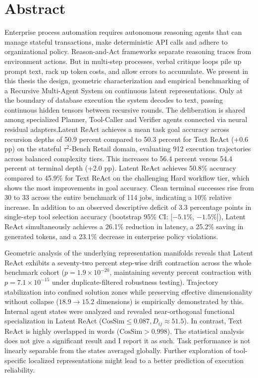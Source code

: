 \documentclass[a4paper, 12pt]{report}
\theoremstyle{definition}
\begin{document}
	\section*{{\huge Abstract}\hfill}
	\vspace{0.6cm}
	\noindent Enterprise process automation requires autonomous reasoning agents that can manage stateful transactions, make deterministic API calls and adhere to organizational policy. Reason-and-Act frameworks separate reasoning traces from environment actions. But in multi-step processes, verbal critique loops pile up prompt text, rack up token costs, and allow errors to accumulate. We present in this thesis the design, geometric characterization and empirical benchmarking of a Recursive Multi-Agent System on continuous latent representations. Only at the boundary of database execution the system decodes to text, passing continuous hidden tensors between recursive rounds. The deliberation is shared among specialized Planner, Tool-Caller and Verifier agents connected via neural residual adapters.Latent ReAct achieves a mean task goal accuracy across recursion depths of 50.9 percent compared to 50.3 percent for Text ReAct (+0.6 pp) on the stateful $\tau^2$-Bench Retail domain, evaluating 912 execution trajectories across balanced complexity tiers. This increases to 56.4 percent versus 54.4 percent at terminal depth (+2.0 pp). Latent ReAct achieves 50.8\% accuracy compared to 45.9\% for Text ReAct on the challenging Hard workflow tier, which shows the most improvements in goal accuracy. Clean terminal successes rise from 30 to 33 across the entire benchmark of 114 jobs, indicating a 10\% relative increase. In addition to an observed descriptive deficit of 3.3 percentage points in single-step tool selection accuracy (bootstrap 95\% CI: [$-5.1\%$, $-1.5\%$]), Latent ReAct simultaneously achieves a 26.1\% reduction in latency, a 25.2\% saving in generated tokens, and a 23.1\% decrease in enterprise policy violations.

	Geometric analysis of the underlying representation manifolds reveals that Latent ReAct exhibits a seventy-two percent step-wise drift contraction across the whole benchmark cohort ($p = 1.9 \times 10^{-20}$, maintaining seventy percent contraction with $p = 7.1 \times 10^{-15}$ under duplicate-filtered robustness testing). Trajectory stabilization into confined solution zones while preserving effective dimensionality without collapse ($18.9 \to 15.2$ dimensions) is empirically demonstrated by this. Internal agent states were analyzed and revealed near-orthogonal functional specialization in Latent ReAct ($\text{CosSim} \le 0.087, D_{ij} \approx 51.5$). In contrast, Text ReAct is highly overlapped in words ($\text{CosSim} > 0.998$). The statistical analysis does not give a significant result and I report it as such. Task performance is not linearly separable from the states averaged globally. Further exploration of tool-specific localized representations might lead to a better prediction of execution reliability.
\end{document}
